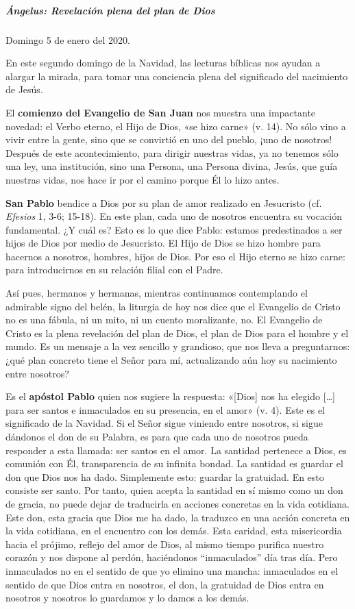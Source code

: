 \documentclass[]{article}
\let\oldsubparagraph\subparagraph
\renewcommand{\subparagraph}[1]{\oldsubparagraph{#1}\mbox{}}
\begin{document}
\subparagraph{Ángelus: Revelación plena del plan de
Dios}\label{uxe1ngelus-revelaciuxf3n-plena-del-plan-de-dios}

Domingo 5 de enero del 2020.

En este segundo domingo de la Navidad, las lecturas bíblicas nos ayudan
a alargar la mirada, para tomar una conciencia plena del significado del
nacimiento de Jesús.

El \textbf{comienzo del Evangelio de San Juan} nos muestra una
impactante novedad: el Verbo eterno, el Hijo de Dios, «se hizo carne»
(v. 14). No sólo vino a vivir entre la gente, sino que se convirtió en
uno del pueblo, ¡uno de nosotros! Después de este acontecimiento, para
dirigir nuestras vidas, ya no tenemos sólo una ley, una institución,
sino una Persona, una Persona divina, Jesús, que guía nuestras vidas,
nos hace ir por el camino porque Él lo hizo antes.

\textbf{San Pablo} bendice a Dios por su plan de amor realizado en
Jesucristo (cf. \emph{Efesios} 1, 3-6; 15-18). En este plan, cada uno de
nosotros encuentra su vocación fundamental. ¿Y cuál es? Esto es lo que
dice Pablo: estamos predestinados a ser hijos de Dios por medio de
Jesucristo. El Hijo de Dios se hizo hombre para hacernos a nosotros,
hombres, hijos de Dios. Por eso el Hijo eterno se hizo carne: para
introducirnos en su relación filial con el Padre.

Así pues, hermanos y hermanas, mientras continuamos contemplando el
admirable signo del belén, la liturgia de hoy nos dice que el Evangelio
de Cristo no es una fábula, ni un mito, ni un cuento moralizante, no. El
Evangelio de Cristo es la plena revelación del plan de Dios, el plan de
Dios para el hombre y el mundo. Es un mensaje a la vez sencillo y
grandioso, que nos lleva a preguntarnos: ¿qué plan concreto tiene el
Señor para mí, actualizando aún hoy su nacimiento entre nosotros?

Es el \textbf{apóstol Pablo} quien nos sugiere la respuesta: «{[}Dios{]}
nos ha elegido [\ldots{}] para ser santos e inmaculados en su presencia,
en el amor» (v. 4). Este es el significado de la Navidad. Si el Señor
sigue viniendo entre nosotros, si sigue dándonos el don de su Palabra,
es para que cada uno de nosotros pueda responder a esta llamada: ser
santos en el amor. La santidad pertenece a Dios, es comunión con Él,
transparencia de su infinita bondad. La santidad es guardar el don que
Dios nos ha dado. Simplemente esto: guardar la gratuidad. En esto
consiste ser santo. Por tanto, quien acepta la santidad en sí mismo como
un don de gracia, no puede dejar de traducirla en acciones concretas en
la vida cotidiana. Este don, esta gracia que Dios me ha dado, la
traduzco en una acción concreta en la vida cotidiana, en el encuentro
con los demás. Esta caridad, esta misericordia hacia el prójimo, reflejo
del amor de Dios, al mismo tiempo purifica nuestro corazón y nos dispone
al perdón, haciéndonos ``inmaculados'' día tras día. Pero inmaculados no
en el sentido de que yo elimino una mancha: inmaculados en el sentido de
que Dios entra en nosotros, el don, la gratuidad de Dios entra en
nosotros y nosotros lo guardamos y lo damos a los demás.
\end{document}
